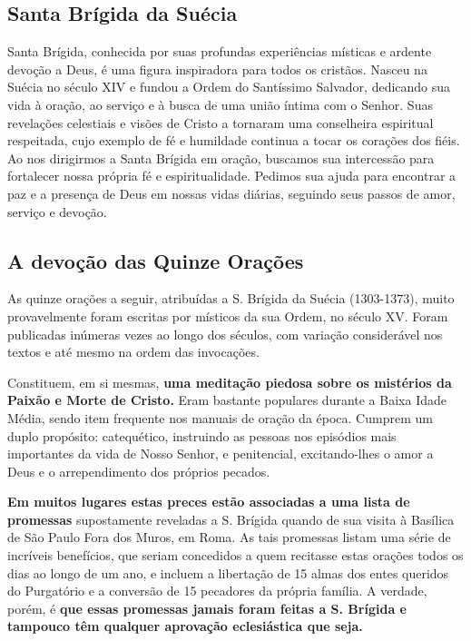 \documentclass[11pt]{article}
\begin{document}
\subsection{Santa Brígida da Suécia}
\begin{justify}
Santa Brígida, conhecida por suas profundas experiências místicas e ardente devoção a Deus, é uma figura inspiradora para todos os cristãos. Nasceu na Suécia no século XIV e fundou a Ordem do Santíssimo Salvador, dedicando sua vida à oração, ao serviço e à busca de uma união íntima com o Senhor. Suas revelações celestiais e visões de Cristo a tornaram uma conselheira espiritual respeitada, cujo exemplo de fé e humildade continua a tocar os corações dos fiéis. Ao nos dirigirmos a Santa Brígida em oração, buscamos sua intercessão para fortalecer nossa própria fé e espiritualidade. Pedimos sua ajuda para encontrar a paz e a presença de Deus em nossas vidas diárias, seguindo seus passos de amor, serviço e devoção.

\begin{center}
 \subsection{A devoção das Quinze Orações}
\end{center}


As quinze orações a seguir, atribuídas a S. Brígida da Suécia (1303-1373), muito provavelmente foram escritas por místicos da sua Ordem, no século XV. Foram publicadas inúmeras vezes ao longo dos séculos, com variação considerável nos textos e até mesmo na ordem das invocações.

Constituem, em si mesmas, \textbf{uma meditação piedosa sobre os mistérios da Paixão e Morte de Cristo.} Eram bastante populares durante a Baixa Idade Média, sendo item frequente nos manuais de oração da época. Cumprem um duplo propósito: catequético, instruindo as pessoas nos episódios mais importantes da vida de Nosso Senhor, e penitencial, excitando-lhes o amor a Deus e o arrependimento dos próprios pecados.

\textbf{Em muitos lugares estas preces estão associadas a uma lista de promessas} supostamente reveladas a S. Brígida quando de sua visita à Basílica de São Paulo Fora dos Muros, em Roma. As tais promessas listam uma série de incríveis benefícios, que seriam concedidos a quem recitasse estas orações todos os dias ao longo de um ano, e incluem a libertação de 15 almas dos entes queridos do Purgatório e a conversão de 15 pecadores da própria família. A verdade, porém, é \textbf{que essas promessas jamais foram feitas a S. Brígida e tampouco têm qualquer aprovação eclesiástica que seja.}


\end{justify}
\end{document}
